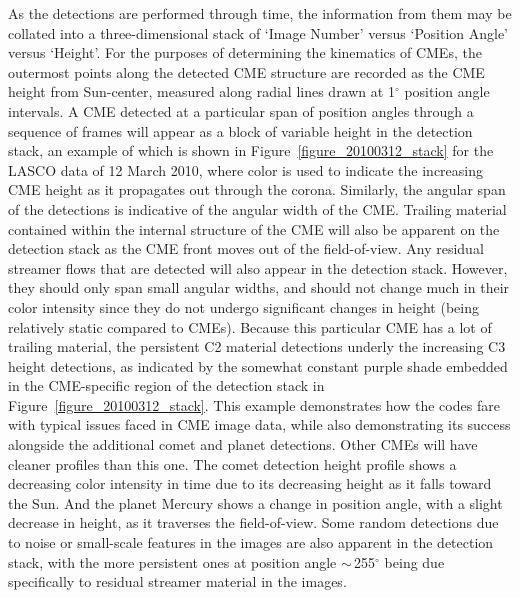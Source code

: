 \documentclass[preprint2]{aastex}
\begin{document}
As the detections are performed through time, the information from them may be collated into a three-dimensional stack of `Image Number' versus `Position Angle' versus `Height'. For the purposes of determining the kinematics of CMEs, the outermost points along the detected CME structure are recorded as the CME height from Sun-center, measured along radial lines drawn at 1$^{\circ}$ position angle intervals. A CME detected at a particular span of position angles through a sequence of frames will appear as a block of variable height in the detection stack, an example of which is shown in Figure~\ref{figure_20100312_stack} for the LASCO data of 12 March 2010, where color is used to indicate the increasing CME height as it propagates out through the corona. Similarly, the angular span of the detections is indicative of the angular width of the CME. Trailing material contained within the internal structure of the CME will also be apparent on the detection stack as the CME front moves out of the field-of-view. Any residual streamer flows that are detected will also appear in the detection stack. However, they should only span small angular widths, and should not change much in their color intensity since they do not undergo significant changes in height (being relatively static compared to CMEs). Because this particular CME has a lot of trailing material, the persistent C2 material detections underly the increasing C3 height detections, as indicated by the somewhat constant purple shade embedded in the CME-specific region of the detection stack in Figure~\ref{figure_20100312_stack}. This example demonstrates how the codes fare with typical issues faced in CME image data, while also demonstrating its success alongside the additional comet and planet detections. Other CMEs will have cleaner profiles than this one. The comet detection height profile shows a decreasing color intensity in time due to its decreasing height as it falls toward the Sun. And the planet Mercury shows a change in position angle, with a slight decrease in height, as it traverses the field-of-view. Some random detections due to noise or small-scale features in the images are also apparent in the detection stack, with the more persistent ones at position angle $\sim$\,255$^{\circ}$ being due specifically to residual streamer material in the images. 
\end{document}
